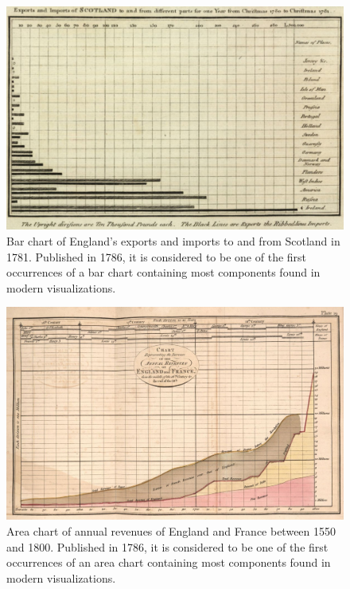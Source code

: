 \begin{figure}[tp]
\centering
\includegraphics[keepaspectratio,width=\linewidth,height=\thirdh]
{images/playfair-bar-chart.jpg}
\caption[Bar Chart by William Playfair from 1786]{%
Bar chart of England's exports and imports to and from Scotland in
1781. Published in 1786, it is considered to be one of the first
occurrences of a bar chart containing most components found in modern
visualizations. }
\label{fig:PlayfairBarChart}
\end{figure}



\begin{figure}[tp]
\centering
\includegraphics[keepaspectratio,width=\linewidth,height=\thirdh]
{images/playfair-area-chart.jpg}
\caption[Area Chart by William Playfair from 1786]{%
Area chart of annual revenues of England and France between 1550 and
1800. Published in 1786, it is considered to be one of the first
occurrences of an area chart containing most components found in
modern visualizations. }
\label{fig:PlayfairAreaChart}
\end{figure}



